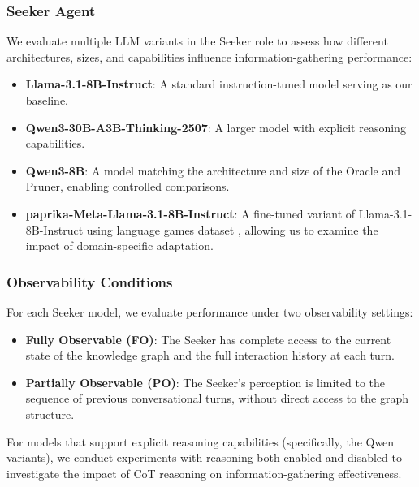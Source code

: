 \documentclass[letterpaper]{article} %
\begin{document}
\subsubsection{Seeker Agent}

We evaluate multiple LLM variants in the Seeker role to assess how different architectures, sizes, and capabilities influence information-gathering performance:

\begin{itemize}
    \item \textbf{Llama-3.1-8B-Instruct}: A standard instruction-tuned model serving as our baseline.
    \item \textbf{Qwen3-30B-A3B-Thinking-2507}: A larger model with explicit reasoning capabilities.
    \item \textbf{Qwen3-8B}: A model matching the architecture and size of the Oracle and Pruner, enabling controlled comparisons.
    \item \textbf{paprika-Meta-Llama-3.1-8B-Instruct}: A fine-tuned variant of Llama-3.1-8B-Instruct using language games dataset \cite{tajwar2025traininggenerallycuriousagent}, allowing us to examine the impact of domain-specific adaptation.
\end{itemize}


\subsubsection{Observability Conditions}

For each Seeker model, we evaluate performance under two observability settings:

\begin{itemize}
    \item \textbf{Fully Observable (FO)}: The Seeker has complete access to the current state of the knowledge graph and the full interaction history at each turn.
    \item \textbf{Partially Observable (PO)}: The Seeker's perception is limited to the sequence of previous conversational turns, without direct access to the graph structure.
\end{itemize}

For models that support explicit reasoning capabilities (specifically, the Qwen variants), we conduct experiments with reasoning both enabled and disabled to investigate the impact of CoT reasoning on information-gathering effectiveness.
\end{document}
